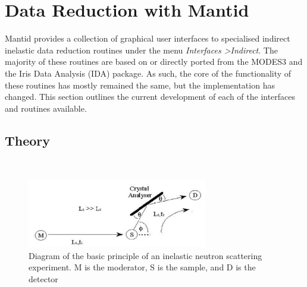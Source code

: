 \documentclass[paper=a4, fontsize=11pt]{scrartcl}	%
\numberwithin{equation}{section}															%
\numberwithin{figure}{section}																%
\numberwithin{table}{section}																%
\begin{document}
%

\section{Data Reduction with Mantid}
Mantid provides a collection of graphical user interfaces to specialised indirect inelastic data reduction routines under the menu \textit{Interfaces \textgreater Indirect}. The majority of these routines are based on or directly ported from the MODES3 and the Iris Data Analysis (IDA) package\cite{wshowells2010}. As such, the core of the functionality of these routines has mostly remained the same, but the implementation has changed. This section outlines the current development of each of the interfaces and routines available.

\subsection{Theory}
\mbox{ }\\
\begin{figure}[H]
\centering
\includegraphics[width=0.7\textwidth]{img/instrument-diagram.png}
\caption{Diagram of the basic principle of an inelastic neutron scattering experiment. M is the moderator, S is the sample, and D is the detector \cite{smukhopadhyay2014}}
\label{fig:instrument-setup}
\end{figure}
\end{document}
